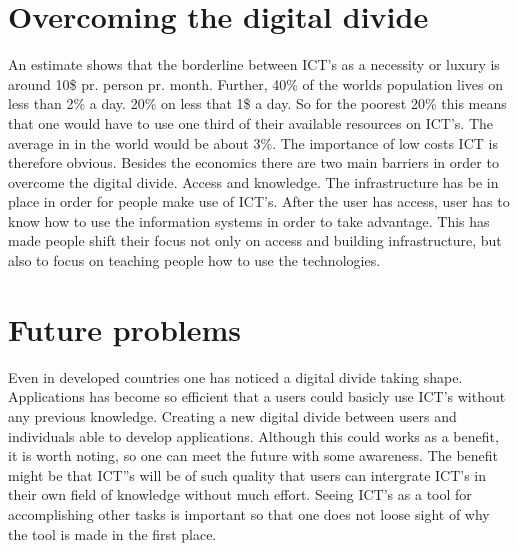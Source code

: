 \section{Overcoming the digital divide}
An estimate shows that the borderline between ICT's as a necessity or luxury is around 10\$ pr. person pr. month.
Further, 40\% of the worlds population lives on less than 2\% a day. 20\% on less that 1\$ a day. 
So for the poorest 20\% this means that one would have to use one third of their available resources on ICT's.
The average in in the world would be about 3\%. 
The importance of low costs ICT is therefore obvious. 
Besides the economics there are two main barriers in order to overcome the digital divide.
Access and knowledge. The infrastructure has be in place in order for people make use of ICT's.
After the user has access, user has to know how to use the information systems in order to take advantage.
This has made people shift their focus not only on access and building infrastructure, but also to focus on teaching people how to use the technologies.
\section{Future problems}
Even in developed countries one has noticed a digital divide taking shape.
Applications has become so efficient that a users could basicly use ICT's without any previous knowledge. 
Creating a new digital divide between users and individuals able to develop applications.
Although this could works as a benefit, it is worth noting, so one can meet the future with some awareness.
The benefit might be that ICT''s will be of such quality that users can intergrate ICT's in their own field of knowledge without much effort. 
Seeing ICT's as a tool for accomplishing other tasks is important so that one does not loose sight of why the tool is made in the first place.
